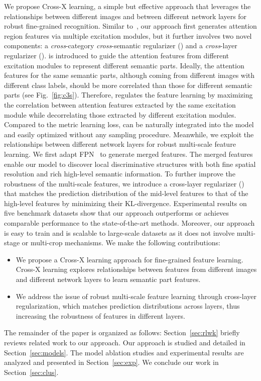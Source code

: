 \documentclass[10pt,twocolumn,letterpaper]{article}
\begin{document}
We propose Cross-X learning, a simple but effective approach that leverages the relationships between different images and between different network layers for robust fine-grained recognition.
Similar to~\cite{mamc18eccv}, our approach first generates attention region features via multiple excitation modules, but it further involves two novel components: a \textit{cross}-category \textit{cross}-semantic regularizer () and a \textit{cross}-layer regularizer ().
 is introduced to guide the attention features from different excitation modules to represent different semantic parts.
Ideally, the attention features for the same semantic parts, although coming from different images with different class labels, should be more correlated than those for different semantic parts (see Fig.~\ref{fig:c3s}).
Therefore,  regulates the feature learning by maximizing the correlation between attention features extracted by the same excitation module while decorrelating those extracted by different excitation modules.
Compared to the metric learning loss,  can be naturally integrated into the model and easily optimized without any sampling procedure.
Meanwhile, we exploit the relationships between different network layers for robust multi-scale feature learning. We first adapt FPN~\cite{fpn17kaiming} to generate merged features. The merged features enable our model to discover local discriminative structures with both fine spatial resolution and rich high-level semantic information. To further improve the robustness of the multi-scale features, we introduce a cross-layer regularizer () that matches the prediction distribution of the mid-level features to that of the high-level features by minimizing their KL-divergence.
Experimental results on five benchmark datasets show that our approach outperforms or achieves comparable performance to the state-of-the-art methods. Moreover, our approach is easy to train and is scalable to large-scale datasets as it does not involve multi-stage or multi-crop mechanisms.
We make the following contributions:
\begin{itemize}
\item We propose a Cross-X learning approach for fine-grained feature learning. Cross-X learning explores relationships between features from different images and different network layers to learn semantic part features.
\item We address the issue of robust multi-scale feature learning through cross-layer regularization, which matches prediction distributions across layers, thus increasing the robustness of features in different layers.
\end{itemize}
The remainder of the paper is organized as follows: Section~\ref{sec:rlwk} briefly reviews related work to our approach. Our approach is studied and detailed in Section~\ref{sec:models}. The model ablation studies and experimental results are analyzed and presented in Section~\ref{sec:exp}. We conclude our work in Section~\ref{sec:clus}.
\end{document}
